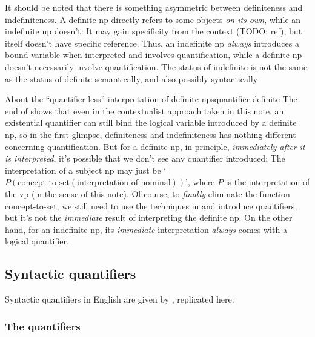 \documentclass[UTF8, a4paper, oneside, scheme=plain]{ctexrep}
\newcommand*{\citepage}[1]{p.~{#1}}
\newcommand{\translate}[1]{`#1'}
\begin{document}
It should be noted that there is something asymmetric between definiteness and indefiniteness.
A definite \acs{np} directly refers to some objects \emph{on its own},
while an indefinite \acs{np} doesn't:
It may gain specificity from the context (TODO: ref), 
but itself doesn't have specific reference.
Thus, an indefinite \acs{np} \emph{always} introduces a bound variable when interpreted 
and involves quantification,
while a definite \acs{np} doesn't necessarily involve quantification.
The status of indefinite is not the same as the status of definite semantically,
and also possibly syntactically \citep{gianollo2021reference,klockmann2020article}

\begin{theorybox}{About the ``quantifier-less'' interpretation of definite \acs{np}s}{quantifier-definite}
    The end of 
    shows that even in the contextualist approach taken in this note,
    an existential quantifier can still bind the logical variable introduced by a definite \acs{np},
    so in the first glimpse, 
    definiteness and indefiniteness has nothing different concerning quantification.
    But for a definite \acs{np},
    in principle, 
    \emph{immediately after it is interpreted},
    it's possible that we don't see any quantifier introduced:
    The interpretation of a subject \acs{np} 
    may just be \translate{$P(\text{concept-to-set}(\text{interpretation-of-nominal}))$},
    where $P$ is the interpretation of the \acs{vp} (in the sense of this note).
    Of course, to \emph{finally} eliminate the function concept-to-set, 
    we still need to use the techniques in 
    and introduce quantifiers,
    but it's not the \emph{immediate} result of interpreting the definite \acs{np}.
    On the other hand, 
    for an indefinite \acs{np},
    its \emph{immediate} interpretation \emph{always} comes with a logical quantifier.
\end{theorybox}

\subsection{Syntactic quantifiers}\label{sec:np.det.quantifier}

Syntactic quantifiers in English are given by \citet[\citepage{361}, {[9]}]{cgel},
replicated here:

\subsubsection{The quantifiers}
\end{document}
